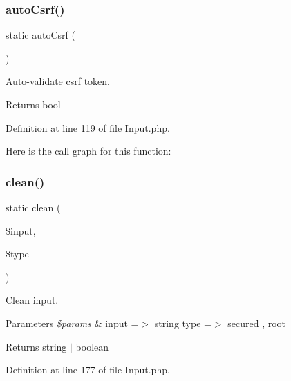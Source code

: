 \subsubsection{\texorpdfstring{auto\+Csrf()}{autoCsrf()}}
{\footnotesize\ttfamily static auto\+Csrf (\begin{DoxyParamCaption}{ }\end{DoxyParamCaption})\hspace{0.3cm}{\ttfamily [static]}}

Auto-\/validate csrf token.

\begin{DoxyReturn}{Returns}
bool 
\end{DoxyReturn}


Definition at line 119 of file Input.\+php.

Here is the call graph for this function\+:
\mbox{\label{class_zest_1_1_input_1_1_input_a56f40473b47394481ddb1018ac904aef}} 
\subsubsection{\texorpdfstring{clean()}{clean()}}
{\footnotesize\ttfamily static clean (\begin{DoxyParamCaption}\item[{}]{\$input,  }\item[{}]{\$type }\end{DoxyParamCaption})\hspace{0.3cm}{\ttfamily [static]}}

Clean input.


\begin{DoxyParams}{Parameters}
{\em \$params} & \textquotesingle{}input\textquotesingle{} =$>$ string \textquotesingle{}type\textquotesingle{} =$>$ secured , root\\
\hline
\end{DoxyParams}
\begin{DoxyReturn}{Returns}
string $\vert$ boolean 
\end{DoxyReturn}


Definition at line 177 of file Input.\+php.

\mbox{\label{class_zest_1_1_input_1_1_input_a1c124976655b4248fedccd9587a94eaa}} 
